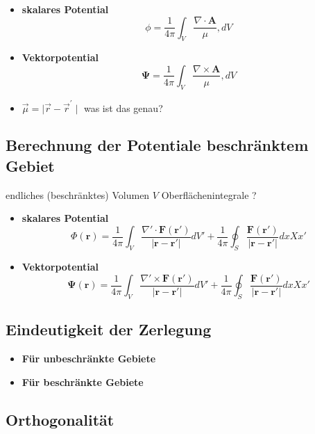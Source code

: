 \begin{itemize}
\item \textbf{skalares Potential}
\begin{equation}
\phi = \frac{1}{4 \pi} \int_{V} \frac{\nabla \cdot \mathbf{A}}{\mu}, dV
\end{equation}
\item \textbf{Vektorpotential}
\begin{equation}
\mathbf{\Psi} = \frac{1}{4 \pi} \int_{V} \frac{\nabla \times \mathbf{A}}{\mu}, dV
\end{equation}
\item $\vec{\mu} = \mid \vec{r} - \vec{r}^{\prime} \mid$ was ist das genau?
\end{itemize}

\subsection{Berechnung der Potentiale beschränktem Gebiet
\label{helmholtz:subsection:BerechnungBeschr}}

endliches (beschränktes) Volumen $V$ Oberflächenintegrale ?

\begin{itemize}
\item \textbf{skalares Potential}
\begin{equation}
\Phi (\mathbf{r}) = \frac{1}{4\pi} \int_V \frac{\nabla' \cdot \mathbf{F}(\mathbf{r}')}{|\mathbf{r} - \mathbf{r}'|} dV' + \frac{1}{4\pi} \oint_S \frac{\mathbf{F}(\mathbf{r}')}{|\mathbf{r} - \mathbf{r}'|} dxXx'
\end{equation}
\item \textbf{Vektorpotential}
\begin{equation}
\mathbf{\Psi}(\mathbf{r}) = \frac{1}{4\pi} \int_V \frac{\nabla' \times \mathbf{F}(\mathbf{r}')}{|\mathbf{r} - \mathbf{r}'|} dV' + \frac{1}{4\pi} \oint_S \frac{\mathbf{F}(\mathbf{r}')}{|\mathbf{r} - \mathbf{r}'|} dxXx'
\end{equation}
\end{itemize}


\subsection{Eindeutigkeit der Zerlegung 
\label{helmholtz:subsection:EindeutigkeitS}}

\begin{itemize}
\item \textbf{Für unbeschränkte Gebiete}
\item \textbf{Für beschränkte Gebiete}
\end{itemize}


\subsection{Orthogonalität
\label{helmholtz:subsection:Orthogonalitaet}}

